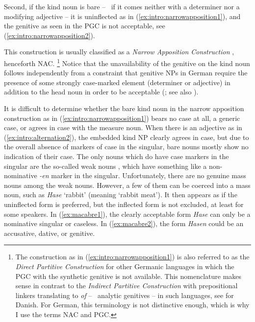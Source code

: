 Second, if the kind noun is bare -- \ie\ if it comes neither with a determiner nor a modifying adjective -- it is uninflected as in (\ref{ex:intro:narrowapposition1}), and the genitive as seen in the PGC is not acceptable, see (\ref{ex:intro:narrowapposition2}).

\begin{exe}
  \ex\label{ex:intro:narrowapposition}
  \begin{xlist}
  \end{xlist}
\end{exe}

This construction is usually classified as a \textit{Narrow Apposition Construction} \citep{Loebel1986}, henceforth NAC.%
\footnote{The construction as in (\ref{ex:intro:narrowapposition1}) is also referred to as the \textit{Direct Partitive Construction} for other Germanic languages in which the PGC with the synthetic genitive is not available.
This nomenclature makes sense in contrast to the \textit{Indirect Partitive Construction} with prepositional linkers translating to \textit{of} -- \ie\ analytic genitives -- in such languages, see \cite{HankamerMikkelsen2008} for Danish.
For German, this terminology is not distinctive enough, which is why I use the terms NAC and PGC.}
Notice that the unavailability of the genitive on the kind noun follows independently from a constraint that genitive NPs in German require the presence of some strongly case-marked element (determiner or adjective) in addition to the head noun in order to be acceptable (\citealp{GallmannLindauer1994,Schachtl1989}; see also \citealp[160]{Eisenberg2013b}).

It is difficult to determine whether the bare kind noun in the narrow apposition construction as in (\ref{ex:intro:narrowapposition1}) bears no case at all, a generic case, or agrees in case with the measure noun.
When there is an adjective as in (\ref{ex:intro:alternation2}), the embedded kind NP clearly agrees in case, but due to the overall absence of markers of case in the singular, bare nouns mostly show no indication of their case.
The only nouns which do have case markers in the singular are the so-called weak nouns \citep{Koepcke1995,Schaefer2016c}, which have something like a non-nominative \textit{-en} marker in the singular.
Unfortunately, there are no genuine mass nouns among the weak nouns.
However, a few of them can be coerced into a mass noun, such as \textit{Hase} `rabbit' (meaning `rabbit meat').
It then appears as if the uninflected form is preferred, but the inflected form is not excluded, at least for some speakers.
In (\ref{ex:macabre1}), the clearly acceptable form \textit{Hase} can only be a nominative singular or caseless.
In (\ref{ex:macabre2}), the form \textit{Hasen} could be an accusative, dative, or genitive.

